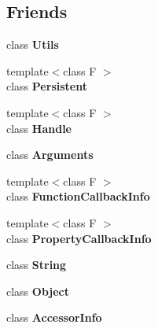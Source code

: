 \subsection*{Friends}
\begin{DoxyCompactItemize}
\item 
\hypertarget{classv8_1_1_local_abc0f7da619e9e72510dc07ed7b5ff6d8}{}class {\bfseries Utils}\label{classv8_1_1_local_abc0f7da619e9e72510dc07ed7b5ff6d8}

\item 
\hypertarget{classv8_1_1_local_afaadbbd2553180545a4e018c3eeac71e}{}{\footnotesize template$<$class F $>$ }\\class {\bfseries Persistent}\label{classv8_1_1_local_afaadbbd2553180545a4e018c3eeac71e}

\item 
\hypertarget{classv8_1_1_local_a67ca1a2d91273eaf85fb3d23ba8ce984}{}{\footnotesize template$<$class F $>$ }\\class {\bfseries Handle}\label{classv8_1_1_local_a67ca1a2d91273eaf85fb3d23ba8ce984}

\item 
\hypertarget{classv8_1_1_local_acbd2a21b98cd2cb694fd02340724b625}{}class {\bfseries Arguments}\label{classv8_1_1_local_acbd2a21b98cd2cb694fd02340724b625}

\item 
\hypertarget{classv8_1_1_local_a76786e6fa2d0eac5e2d4f647659d0d23}{}{\footnotesize template$<$class F $>$ }\\class {\bfseries Function\+Callback\+Info}\label{classv8_1_1_local_a76786e6fa2d0eac5e2d4f647659d0d23}

\item 
\hypertarget{classv8_1_1_local_a5018adab21fade2b42f4f60e45fa1083}{}{\footnotesize template$<$class F $>$ }\\class {\bfseries Property\+Callback\+Info}\label{classv8_1_1_local_a5018adab21fade2b42f4f60e45fa1083}

\item 
\hypertarget{classv8_1_1_local_a7fb804f7dc96dd9f705c84095f37f1ca}{}class {\bfseries String}\label{classv8_1_1_local_a7fb804f7dc96dd9f705c84095f37f1ca}

\item 
\hypertarget{classv8_1_1_local_a0720b5f434e636e22a3ed34f847eec57}{}class {\bfseries Object}\label{classv8_1_1_local_a0720b5f434e636e22a3ed34f847eec57}

\item 
\hypertarget{classv8_1_1_local_aa6da8bc2cce791f1f1358707f98c45d1}{}class {\bfseries Accessor\+Info}\label{classv8_1_1_local_aa6da8bc2cce791f1f1358707f98c45d1}


\end{DoxyCompactItemize}
